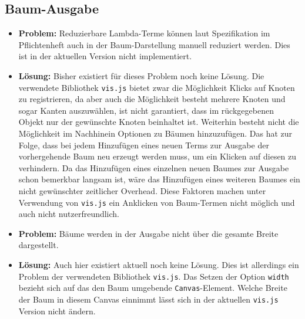 \documentclass[parskip=full,11pt]{scrartcl}
\begin{document}
\begin{itemize}
\subsection{Baum-Ausgabe}
\begin{itemize}
\item[] \textbf{Problem:} Reduzierbare Lambda-Terme können laut Spezifikation im Pflichtenheft auch in der Baum-Darstellung manuell reduziert werden. Dies ist in der aktuellen Version nicht implementiert.
\item[] \textbf{Lösung:} Bisher existiert für dieses Problem noch keine Lösung. Die verwendete Bibliothek \texttt{vis.js} bietet zwar die Möglichkeit Klicks auf Knoten zu registrieren, da aber auch die Möglichkeit besteht mehrere Knoten und sogar Kanten auszuwählen, ist nicht garantiert, dass im rückgegebenen Objekt nur der gewünschte Knoten beinhaltet ist. Weiterhin besteht nicht die Möglichkeit im Nachhinein Optionen zu Bäumen hinzuzufügen. Das hat zur Folge, dass bei jedem Hinzufügen eines neuen Terms zur Ausgabe der vorhergehende Baum neu erzeugt werden muss, um ein Klicken auf diesen zu verhindern. Da das Hinzufügen eines einzelnen neuen Baumes zur Ausgabe schon bemerkbar langsam ist, wäre das Hinzufügen eines weiteren Baumes ein nicht gewünschter zeitlicher Overhead.
Diese Faktoren machen unter Verwendung von \texttt{vis.js} ein Anklicken von Baum-Termen nicht möglich und auch nicht nutzerfreundlich. 

\item[] \textbf{Problem:} Bäume werden in der Ausgabe nicht über die gesamte Breite dargestellt.
\item[] \textbf{Lösung:} Auch hier existiert aktuell noch keine Lösung. Dies ist allerdings ein Problem der verwendeten Bibliothek \texttt{vis.js}. Das Setzen der Option \texttt{width} bezieht sich auf das den Baum umgebende \texttt{Canvas}-Element. Welche Breite der Baum in diesem Canvas einnimmt lässt sich in der aktuellen \texttt{vis.js} Version nicht ändern.
\end{itemize}


\newpage

\end{itemize}
\end{document}
